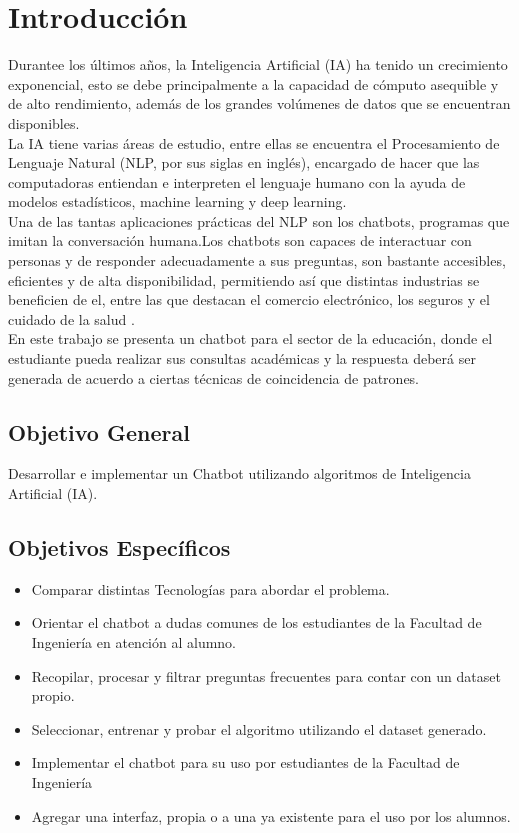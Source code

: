 \chapter[Introducción]{Introducción}
Durantee los últimos años, la Inteligencia Artificial (IA) ha tenido un crecimiento exponencial,
esto se debe principalmente a la capacidad de cómputo asequible y de alto rendimiento, además de
los grandes volúmenes de datos que se encuentran disponibles.\cite{Oracle}\\
\indent La IA tiene varias áreas de estudio, entre ellas se encuentra el Procesamiento de Lenguaje
Natural (NLP, por sus siglas en inglés), encargado de hacer que las computadoras entiendan e
interpreten el lenguaje humano con la ayuda de modelos estadísticos, machine learning y deep
learning.\\
\indent Una de las tantas aplicaciones prácticas del NLP son los chatbots, programas que imitan la
conversación humana.Los chatbots son capaces de interactuar con personas y de responder
adecuadamente a sus preguntas, son bastante accesibles, eficientes y de alta disponibilidad,
permitiendo así que distintas industrias se beneficien de el, entre las que destacan el comercio
electrónico, los seguros y el cuidado de la salud .\cite{building_chat-bots-with-python}\\
\indent En este trabajo se presenta un chatbot para el sector de la educación, donde el estudiante
pueda realizar sus consultas académicas y la respuesta deberá ser generada de acuerdo a ciertas
técnicas de coincidencia de patrones.

\section{Objetivo General}
Desarrollar e implementar un Chatbot utilizando algoritmos de Inteligencia Artificial (IA).

\section{Objetivos Específicos}
\begin{itemize}
	\item Comparar distintas Tecnologías para abordar el problema.
	\item Orientar el chatbot a dudas comunes de los estudiantes de la Facultad de Ingeniería en
	      atención al alumno.
	\item Recopilar, procesar y filtrar preguntas frecuentes para contar con un dataset propio.
	\item Seleccionar, entrenar y probar el algoritmo utilizando el dataset generado.
	\item Implementar el chatbot para su uso por estudiantes de la Facultad de Ingeniería
	\item Agregar una interfaz, propia o a una ya existente para el uso por los alumnos.
\end{itemize}

